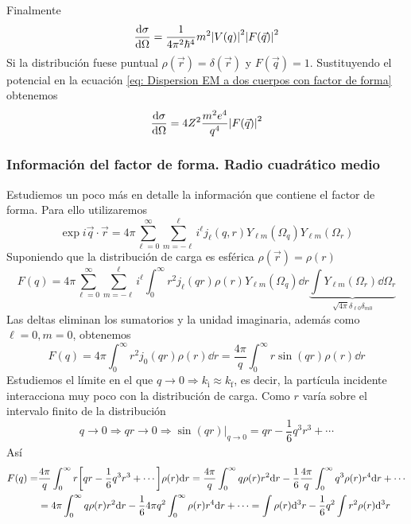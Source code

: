Finalmente
\begin{equation}
    \dv{\sigma}{\Omega}=\frac{1}{4\pi^2\hbar^4} m^2 \abs{V(q)}^2\abs{F(\vec{q})}^2
    \label{eq: Dispersion EM a dos cuerpos con factor de forma}
\end{equation}
Si la distribución fuese puntual $\rho(\vec{r})=\delta(\vec{r})$ y $F(\vec{q})=1$. Sustituyendo el potencial en la ecuación \ref{eq: Dispersion EM a dos cuerpos con factor de forma} obtenemos
\begin{equation}
      \dv{\sigma}{\Omega}=4Z^2 \frac{m^2e^4}{q^4} \abs{F(\vec{q})}^2
    \label{eq: Dispersion relativista EM a dos cuerpos con factor de forma}
\end{equation}
\clearpage
\subsubsection{Información del factor de forma. Radio cuadrático medio}
Estudiemos un poco más en detalle la información que contiene el factor de forma. Para ello utilizaremos 
\begin{equation}
    \exp{i\vec{q}\cdot \vec{r}}= 4\pi \sum^\infty_{\ell=0} \sum^\ell_{m=-\ell} i^\ell j_\ell(q,r)Y_{\ell m}(\Omega_q)Y_{\ell m}(\Omega_r)
    \label{eq: desarrollo en armonicos esfericos exponencial imaginaria}
\end{equation}
Suponiendo que la distribución de carga es esférica $\rho(\vec{r})=\rho(r)$
\begin{equation}
    F(q)= 4\pi \sum^\infty_{\ell=0} \sum^\ell_{m=-\ell} i^\ell \int^\infty_0 r^2 j_\ell(qr) \rho(r)Y_{\ell m}(\Omega_q) \dd r\underbrace{\int Y_{\ell m}(\Omega_r)\dd\Omega_r}_{\sqrt{4\pi}\delta_{\ell 0} \delta_{m 0}}
\end{equation}
Las deltas eliminan los sumatorios y la unidad imaginaria, además como $\ell=0,m=0$, obtenemos
\begin{equation}
    F(q)=4\pi\int^\infty_0 r^2 j_0(qr)\rho(r)\dd r=\frac{4\pi}{q} \int^\infty_0 r \sin(qr)\rho(r)\dd r
    \label{eq: factor de forma deistribucion esferica}
\end{equation}
Estudiemos el límite en el que $q\xrightarrow{} 0 \Rightarrow k_\mathrm{i}\approx k_\mathrm{f}$, es decir, la partícula incidente interacciona muy poco con la distribución de carga. Como $r$ varía sobre el intervalo finito de la distribución
$$q\xrightarrow[]{}0 \Rightarrow qr\xrightarrow{}0 \Rightarrow \sin(qr)|_{q\xrightarrow[]{}0}=qr-\frac{1}{6}q^3r^3+\cdots$$
Así
\begin{equation*}
    \begin{aligned}
        F(q)=&\frac{4\pi}{q}\int^\infty_0 r\qty[qr-\frac{1}{6}q^3r^3+\cdots]\rho(r)\dd r=\frac{4\pi}{q}\int^\infty_0 q\rho(r) r^2\dd r -\frac{1}{6}\frac{4\pi}{q}\int^\infty_0 q^3\rho(r)r^4 \dd r+ \cdots\\
        &=4\pi\int^\infty_0 q\rho(r) r^2\dd r -\frac{1}{6}4\pi q^2\int^\infty_0 \rho(r)r^4 \dd r+ \cdots=\int \rho(r)\dd^3r-\frac{1}{6}q^2\int r^2 \rho(r)\dd^3r
    \end{aligned}
\end{equation*}
